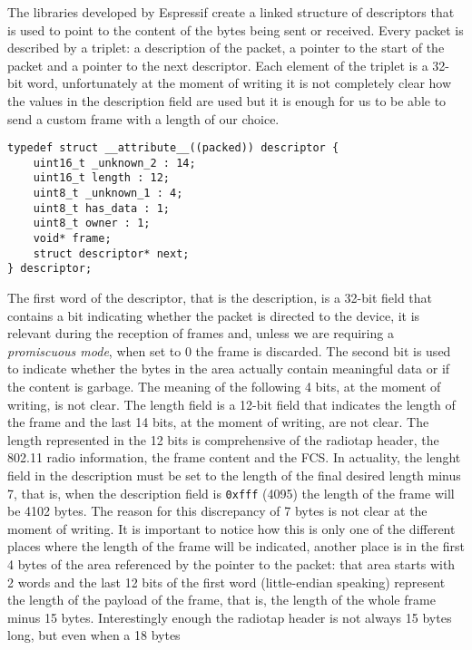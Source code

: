 The libraries developed by Espressif create a linked structure of descriptors that
is used to point to the content of the bytes being sent or received.
Every packet is described by a triplet: a description of the packet, a pointer to the start of the packet
and a pointer to the next descriptor. Each element of the triplet is a 32-bit word, unfortunately
at the moment of writing it is not completely clear how the values in the description field are used
but it is enough for us to be able to send a custom frame with a length of our choice.
\newsavebox{\descriptor}
\begin{lrbox}{\descriptor}
\begin{lstlisting}
typedef struct __attribute__((packed)) descriptor {
	uint16_t _unknown_2 : 14;
	uint16_t length : 12;
	uint8_t _unknown_1 : 4;
	uint8_t has_data : 1;
	uint8_t owner : 1;
	void* frame;
	struct descriptor* next;
} descriptor;
\end{lstlisting}
\end{lrbox}
\usebox{\descriptor}
The first word of the descriptor, that is the description, is a 32-bit field 
that contains a bit indicating whether the packet is directed to the device,
it is relevant during the reception of frames and, unless we
are requiring a \textit{promiscuous mode}, when set to 0 the frame is discarded.
The second bit is used to indicate whether the bytes in the area actually contain 
meaningful data or if the content is garbage. The meaning of the following 4 bits, at the moment
of writing, is not clear. 
The length field is a 12-bit field that indicates the length of the frame and the last 14 bits,
at the moment of writing, are not clear.
The length represented in the 12 bits is comprehensive of the radiotap header, 
the 802.11 radio information, the frame content and the FCS.
In actuality, the lenght field in the description must be set to the length of the final desired
length minus 7, that is, when the description field is \texttt{0xfff} (4095) the length of the frame
will be 4102 bytes. The reason for this discrepancy of 7 bytes is not clear at the moment of writing.
It is important to notice how this is only one of the different places where the length of the frame
will be indicated, another place is in the first 4 bytes of the area referenced by the pointer to the packet:
that area starts with 2 words and the last 12 bits of the first word (little-endian speaking)
represent the length of the payload of the frame, that is, the length of the whole frame minus 15 bytes. 
Interestingly enough the radiotap header is not always 15 bytes long, but even when a 18 bytes 
